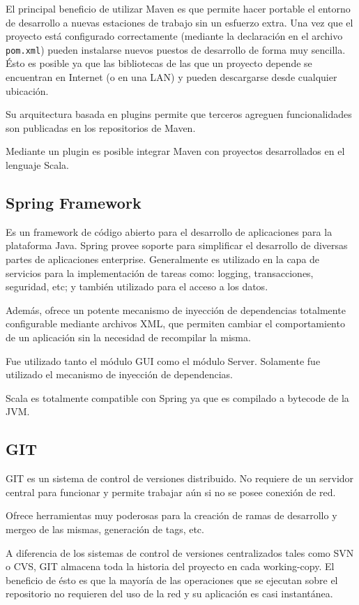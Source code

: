 \documentclass[12pt,a4paper]{article}
\begin{document}
El principal beneficio de utilizar Maven es que permite hacer portable el entorno de desarrollo a nuevas estaciones
de trabajo sin un esfuerzo extra. Una vez que el proyecto está configurado correctamente (mediante la declaración en el 
archivo \texttt{pom.xml}) pueden instalarse nuevos puestos de desarrollo de forma muy sencilla. Ésto es posible
ya que las bibliotecas de las que un proyecto depende se encuentran en Internet (o en una LAN) y pueden descargarse
desde cualquier ubicación.

Su arquitectura basada en plugins permite que terceros agreguen funcionalidades son publicadas en los repositorios
de Maven.

Mediante un plugin es posible integrar Maven con proyectos desarrollados en el lenguaje Scala.

\subsection{Spring Framework}
Es un framework de código abierto para el desarrollo de aplicaciones para la plataforma Java. Spring provee soporte
para simplificar el desarrollo de diversas partes de aplicaciones enterprise. Generalmente es utilizado en
la capa de servicios para la implementación de tareas como: logging, transacciones, seguridad, etc; y también 
utilizado para el acceso a los datos.

Además, ofrece un potente mecanismo de inyección de dependencias totalmente configurable mediante archivos XML, que
permiten cambiar el comportamiento de un aplicación sin la necesidad de recompilar la misma.

Fue utilizado tanto el módulo GUI como el módulo Server. Solamente fue utilizado el mecanismo de inyección
de dependencias.

Scala es totalmente compatible con Spring ya que es compilado a bytecode de la JVM.

\subsection{GIT}
GIT es un sistema de control de versiones distribuido. No requiere de un servidor central para funcionar y permite
trabajar aún si no se posee conexión de red.

Ofrece herramientas muy poderosas para la creación de ramas de desarrollo y mergeo de las mismas, generación de tags, etc.

A diferencia de los sistemas de control de versiones centralizados tales como SVN o CVS, GIT almacena toda la historia
del proyecto en cada working-copy. El beneficio de ésto es que la mayoría de las operaciones que se ejecutan sobre
el repositorio no requieren del uso de la red y su aplicación es casi instantánea.
\end{document}
